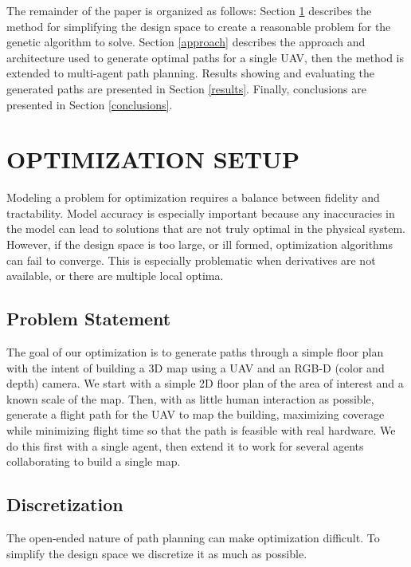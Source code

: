 \documentclass[letterpaper, 10 pt, conference]{ieeeconf}  %
\begin{document}
The remainder of the paper is organized as follows: Section \ref{setup} describes the method for simplifying the design space to create a reasonable problem for the genetic algorithm to solve. Section \ref{approach} describes the approach and architecture used to generate optimal paths for a single UAV, then the method is extended to multi-agent path planning.
Results showing and evaluating the generated paths are presented in Section \ref{results}. Finally, conclusions are presented in Section \ref{conclusions}.

\section{OPTIMIZATION SETUP}\label{setup}

Modeling a problem for optimization requires a balance between fidelity and tractability. Model accuracy is especially important because any inaccuracies in the model can lead to solutions that are not truly optimal in the physical system. However, if the design space is too large, or ill formed, optimization algorithms can fail to converge. This is especially problematic when derivatives are not available, or there are multiple local optima.

\subsection{Problem Statement}


The goal of our optimization is to generate paths through a simple floor plan with the intent of building a 3D map using a UAV and an RGB-D (color and depth) camera. We start with a simple 2D floor plan of the area of interest and a known scale of the map. Then, with as little human interaction as possible, generate a flight path for the UAV to map the building, maximizing coverage while minimizing flight time so that the path is feasible with real hardware. We do this first with a single agent, then extend it to work for several agents collaborating to build a single map.

\subsection{Discretization}

The open-ended nature of path planning can make optimization difficult. To simplify the design space we discretize it as much as possible.
\end{document}
